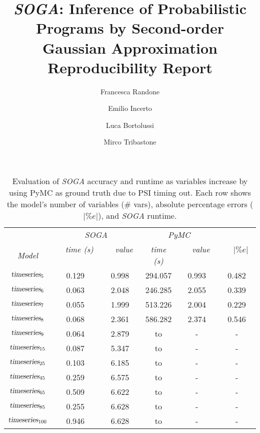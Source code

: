 \documentclass[a4paper]{llncs}
\newcommand{\soga}{\textsl{SOGA}}
\begin{document}
\mainmatter

\title{\soga: Inference of Probabilistic Programs by Second-order Gaussian Approximation Reproducibility Report}


\author{Francesca Randone  \and Emilio Incerto  \and Luca Bortolussi  \and Mirco Tribastone}

\allowdisplaybreaks[0]

\maketitle
\setcounter{table}{2}
\begin{table}[t]
    \centering
    \caption{Evaluation of \soga{} accuracy and runtime as variables increase by using PyMC as ground truth due to PSI timing out. Each row shows the model's number of variables (\# vars), absolute percentage errors ($|\%e|$), and \soga{} runtime.} 
     \begin{tabular}{cccccc}
     \toprule 
        &\multicolumn{2}{c}{\emph{SOGA}}&\multicolumn{2}{c}{\emph{PyMC}}\\
        \cmidrule(l){2-3}  \cmidrule(l){4-5}
        \emph{Model}&
    \ \ \emph{time (s)}  \ \ &  \ \  \emph{value} \ \ & \emph{time (s)} 
    & \ \  \emph{value} \ \  &\ \  $|\%e|$ \ \  \\
    \midrule
        $\textsl{timeseries}_{5}$ & 0.129 & 0.998 & 294.057 & 0.993 &0.482 \\
        $\textsl{timeseries}_{6}$ & 0.063 & 2.048 & 246.285 & 2.055 &0.339 \\
        $\textsl{timeseries}_{7}$ & 0.055 & 1.999 & 513.226 & 2.004 &0.229 \\
        $\textsl{timeseries}_{8}$ & 0.068 & 2.361 & 586.282 & 2.374 &0.546 \\
        $\textsl{timeseries}_{9}$ & 0.064 & 2.879 & to & - &- \\
        $\textsl{timeseries}_{15}$ & 0.087 & 5.347 & to & - &- \\
        $\textsl{timeseries}_{25}$ & 0.103 & 6.185 & to & - &- \\
        $\textsl{timeseries}_{45}$ & 0.259 & 6.575 & to & - &- \\
        $\textsl{timeseries}_{65}$ & 0.509 & 6.622 & to & - &- \\
        $\textsl{timeseries}_{85}$ & 0.255 & 6.628 & to & - &- \\
        $\textsl{timeseries}_{100}$ & 0.946 & 6.628 & to & - &- \\
    \bottomrule
    \end{tabular}
    \label{tab:sensVar}
\end{table}
\end{document}
